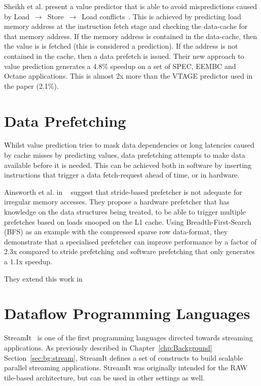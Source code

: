 Sheikh et al. present a value predictor that is able to avoid mispredictions caused by Load $\,\to\,$ Store $\,\to\,$ Load conflicts~\cite{sheikh2017value}.
This is achieved by predicting load memory address at the instruction fetch stage and checking the data-cache for that memory address.
If the memory address is contained in the data-cache, then the value is is fetched (this is considered a prediction).
If the address is not contained in the cache, then a data prefetch is issued.
Their new approach to value prediction generates a 4.8\% speedup on a set of SPEC, EEMBC and Octane applications.
This is almost 2x more than the VTAGE predictor used in the paper (2.1\%).

\section{Data Prefetching}
Whilst value prediction tries to mask data dependencies or long latencies caused by cache misses by predicting values, data prefetching attempts to make data available before it is needed.
This can be achieved both in software by inserting instructions that trigger a data fetch-request ahead of time, or in hardware.

Ainsworth et al. in ~\cite{graphPrefetch2016} suggest that stride-based prefetcher is not adequate for irregular memory accesses.
They propose a hardware prefetcher that has knowledge on the data structures being treated, to be able to trigger multiple prefetches based on loads snooped on the L1 cache.
Using Breadth-First-Search (BFS) as an example with the compressed sparse row data-format, they demonstrate that a specialised prefetcher can improve performance by a factor of 2.3x compared to stride prefetching and software prefetching that only generates a 1.1x speedup.

They extend this work in ~\cite{eventTriggeredPrefetcher2018}


\section{Dataflow Programming Languages}

StreamIt~\cite{theis2002streamit} is one of the first programming languages directed towards streaming applications.
As previously described in Chapter~\ref{chp:Background} Section~\ref{sec:bg:stream}, StreamIt defines a set of constructs to build scalable parallel streaming applications.
StreamIt was originally intended for the RAW ~\cite{waingold1997raw} tile-based architecture, but can be used in other settings as well.

